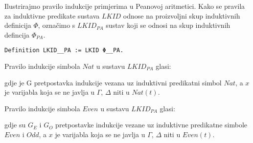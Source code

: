 Ilustrirajmo pravilo indukcije primjerima u Peanovoj aritmetici.
Kako se pravila za induktivne predikate sustava \(\mathit{LKID}\) odnose na proizvoljni skup induktivnih definicija \(\Phi\),
označimo s \(\mathit{LKID}_{\mathit{PA}}\)  sustav koji se odnosi na skup induktivnih defincija \(\Phi_{\mathit{PA}}\).
\begin{verbatim}
Definition LKID__PA := LKID Φ__PA.
\end{verbatim}
\begin{example}
  Pravilo indukcije simbola \(\mathit{Nat}\)
  u sustavu \(\mathit{LKID}_{\mathit{PA}}\) glasi:
  \begin{prooftree}
  \end{prooftree}
  \noindent gdje je G pretpostavka indukcije vezana uz induktivni predikatni simbol \(\mathit{Nat}\),
  a \(x\) je varijabla koja se ne javlja u \(\Gamma\), \(\Delta\) niti u \(\mathit{Nat}(t)\).
\end{example}

\begin{example}
  Pravilo indukcije simbola  \(\mathit{Even}\)
  u sustavu \(\mathit{LKID}_{\mathit{PA}}\) glasi:
  \begin{small}
    \begin{prooftree}
    \end{prooftree}
  \end{small}
  \noindent gdje su \(G_{E}\) i \(G_{O}\) pretpostavke indukcije vezane uz
  induktivne predikatne simbole \(\mathit{Even}\) i \(\mathit{Odd}\),
  a \(x\) je varijabla koja se ne javlja u \(\Gamma\), \(\Delta\) niti u \(\mathit{Even}(t)\).
\end{example}

